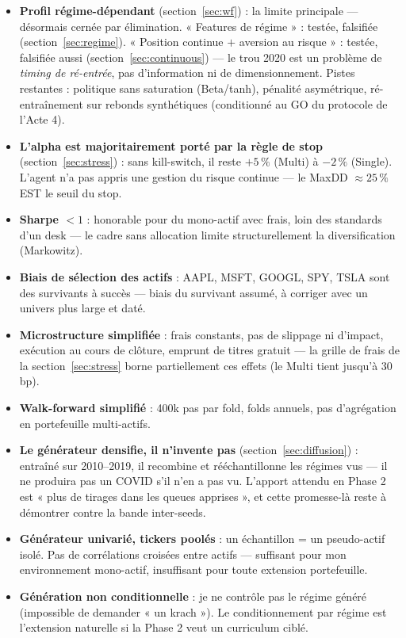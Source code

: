 \documentclass[11pt,a4paper]{article}
\begin{document}
\begin{itemize}[itemsep=3pt]
  \item \textbf{Profil régime-dépendant} (section~\ref{sec:wf}) : la limite
        principale --- désormais cernée par élimination. « Features de régime » :
        testée, falsifiée (section~\ref{sec:regime}). « Position continue $+$
        aversion au risque » : testée, falsifiée aussi
        (section~\ref{sec:continuous}) --- le trou 2020 est un problème de
        \emph{timing de ré-entrée}, pas d'information ni de dimensionnement.
        Pistes restantes : politique sans saturation (Beta/tanh), pénalité
        asymétrique, ré-entraînement sur rebonds synthétiques (conditionné au
        GO du protocole de l'Acte 4).
  \item \textbf{L'alpha est majoritairement porté par la règle de stop}
        (section~\ref{sec:stress}) : sans kill-switch, il reste $+5\,\%$ (Multi) à
        $-2\,\%$ (Single). L'agent n'a pas appris une gestion du risque continue ---
        le MaxDD $\approx 25\,\%$ EST le seuil du stop.
  \item \textbf{Sharpe $< 1$} : honorable pour du mono-actif avec frais, loin des
        standards d'un desk --- le cadre sans allocation limite structurellement la
        diversification (Markowitz).
  \item \textbf{Biais de sélection des actifs} : AAPL, MSFT, GOOGL, SPY, TSLA sont des
        survivants à succès --- biais du survivant assumé, à corriger avec un univers
        plus large et daté.
  \item \textbf{Microstructure simplifiée} : frais constants, pas de slippage ni
        d'impact, exécution au cours de clôture, emprunt de titres gratuit --- la grille
        de frais de la section~\ref{sec:stress} borne partiellement ces effets
        (le Multi tient jusqu'à 30\,bp).
  \item \textbf{Walk-forward simplifié} : 400k pas par fold, folds annuels, pas
        d'agrégation en portefeuille multi-actifs.
  \item \textbf{Le générateur densifie, il n'invente pas} (section~\ref{sec:diffusion}) :
        entraîné sur 2010--2019, il recombine et rééchantillonne les régimes vus ---
        il ne produira pas un COVID s'il n'en a pas vu. L'apport attendu en Phase 2
        est « plus de tirages dans les queues apprises », et cette promesse-là reste
        à démontrer contre la bande inter-seeds.
  \item \textbf{Générateur univarié, tickers poolés} : un échantillon = un
        pseudo-actif isolé. Pas de corrélations croisées entre actifs --- suffisant
        pour mon environnement mono-actif, insuffisant pour toute extension
        portefeuille.
  \item \textbf{Génération non conditionnelle} : je ne contrôle pas le régime généré
        (impossible de demander « un krach »). Le conditionnement par régime est
        l'extension naturelle si la Phase 2 veut un curriculum ciblé.
\end{itemize}
\end{document}
